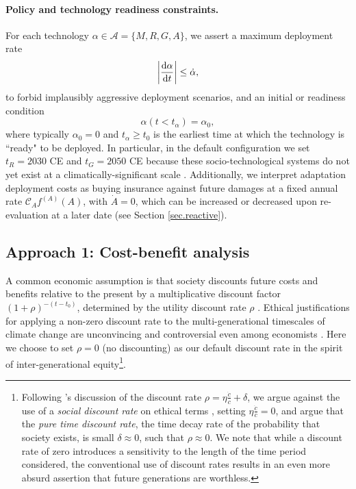 \documentclass{article}
\begin{document}
\paragraph{Policy and technology readiness constraints.} For each technology $\alpha \in \mathcal{A} = \{ M, R, G, A\}$, we assert a maximum deployment rate
\begin{equation}
    \abs{\dv{\alpha}{t}} \le \dot{\alpha},
\end{equation}
to forbid implausibly aggressive deployment scenarios, and an initial or readiness condition
\begin{equation}
    \alpha(t < t_{\alpha}) = \alpha_{0},
\end{equation} where typically $\alpha_{0} = 0$ and $t_{\alpha} \ge t_{0}$ is the earliest time at which the technology is ``ready" to be deployed. In particular, in the default configuration we set $t_{R} = 2030$ CE and $t_{G} = 2050$ CE because these socio-technological systems do not yet exist at a climatically-significant scale \citep{minx_negative_2018, flegal_solar_2019}. Additionally, we interpret adaptation deployment costs as buying insurance against future damages at a fixed annual rate $\mathcal{C}_{A} f^{(A)}(A)$, with $\dot{A} = 0$, which can be increased or decreased upon re-evaluation at a later date (see Section \ref{sec.reactive}).

\subsection{Approach 1: Cost-benefit analysis}\label{sec.cost_benefit}

A common economic assumption is that society discounts future costs and benefits relative to the present by a multiplicative discount factor $(1 + \rho)^{-(t-t_{0})}$, determined by the utility discount rate $\rho$ \citep[e.g. see reviews in][]{broome_discounting_1994, stern_economics_2007}. Ethical justifications for applying a non-zero discount rate to the multi-generational timescales of climate change are unconvincing and controversial even among economists \citep{ramsey_mathematical_1928, solow_economics_1974, stern_economics_2007}. Here we choose to set $\rho = 0$ (no discounting) as our default discount rate in the spirit of inter-generational equity\footnote{Following \cite{stern_economics_2007}'s discussion of the discount rate $\rho = \eta \frac{\dot{c}}{c} + \delta$, we argue against the use of a \textit{social discount rate} on ethical terms \citep{ramsey_mathematical_1928, solow_economics_1974}, setting $\eta \frac{\dot{c}}{c}=0$, and argue that the \textit{pure time discount rate}, the time decay rate of the probability that society exists, is small $\delta \approx 0$, such that $\rho \approx 0$. We note that while a discount rate of zero introduces a sensitivity to the length of the time period considered, the conventional use of discount rates results in an even more absurd assertion that future generations are worthless.}. 
\end{document}
